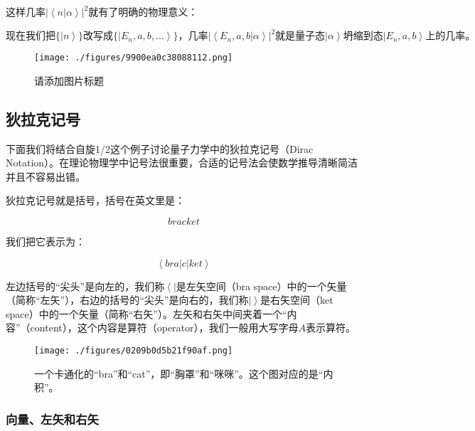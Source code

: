 这样几率$\left| \left\langle n | \alpha \right\rangle \right|^2 $就有了明确的物理意义：

\begin{equation}
\text{现在我们把$\{ \left| n \right\rangle \}$改写成$\{ \left| E_n , a, b, ... \right\rangle  \}$，几率$\left|  \left\langle E_n, a, b | \alpha \right\rangle  \right|^2 $就是量子态$\left| \alpha \right\rangle $坍缩到态$\left| E_n, a, b \right\rangle$上的几率。}~
\end{equation}

\begin{figure}[ht]
\centering
\texttt{[image: ./figures/9900ea0c38088112.png]}
\caption{请添加图片标题} \label{fig_QMPre3_7}
\end{figure}

\subsection{狄拉克记号}

下面我们将结合自旋1/2这个例子讨论量子力学中的狄拉克记号（Dirac Notation）。在理论物理学中记号法很重要，合适的记号法会使数学推导清晰简洁并且不容易出错。

狄拉克记号就是括号，括号在英文里是：

\begin{equation}
bracket~
\end{equation}

我们把它表示为：

\begin{equation}
\left\langle  {bra}  \right|  {c} \left|   {ket}  \right\rangle~
\end{equation}

左边括号的“尖头”是向左的，我们称$\left\langle  {  }  \right|$是左矢空间（bra space）中的一个矢量（简称“左矢”），右边的括号的“尖头”是向右的，我们称$\left|  { }  \right\rangle $是右矢空间（ket space）中的一个矢量（简称“右矢”）。左矢和右矢中间夹着一个“内容”（content），这个内容是算符（operator），我们一般用大写字母$A$表示算符。

\begin{figure}[ht]
\centering
\texttt{[image: ./figures/0209b0d5b21f90af.png]}
\caption{⼀个卡通化的“bra”和“cat”，即“胸罩”和“咪咪”。这个图对应的是“内积”。} \label{fig_QMPre3_8}
\end{figure}

\subsubsection{向量、左矢和右矢}

